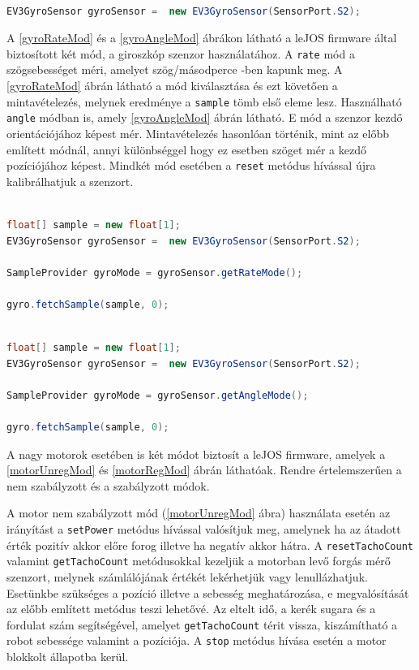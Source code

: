 \begin{lstlisting}[label=gyroPort, caption= Az \texttt{S2} porton keresztük hozzáférés a giroszkop szenzorhoz, language=Java]

EV3GyroSensor gyroSensor =  new EV3GyroSensor(SensorPort.S2);

\end{lstlisting}

A \ref{gyroRateMod} és a \ref{gyroAngleMod} ábrákon látható a leJOS firmware által biztosított két mód, a giroszkóp szenzor használatához. A \texttt{rate} mód a szögsebességet méri, amelyet szög/másodperce -ben kapunk meg. A \ref{gyroRateMod} ábrán látható a mód kiválasztása és ezt követően a mintavételezés, melynek eredménye a \texttt{sample} tömb első eleme lesz. Használható \texttt{angle} módban is, amely \ref{gyroAngleMod} ábrán látható. E mód a szenzor kezdő orientációjához képest mér. Mintavételezés hasonlóan történik, mint az előbb említett módnál, annyi különbséggel hogy ez esetben szöget mér a kezdő pozíciójához képest. Mindkét mód esetében a \texttt{reset} metódus hívással újra kalibrálhatjuk a szenzort.

\begin{lstlisting}[label=gyroRateMod, caption= Giroszkóp szenzor \texttt{rate} mód használata, language=Java]

float[] sample = new float[1];
EV3GyroSensor gyroSensor =  new EV3GyroSensor(SensorPort.S2);

SampleProvider gyroMode = gyroSensor.getRateMode();

gyro.fetchSample(sample, 0);

\end{lstlisting}

\begin{lstlisting}[label=gyroAngleMod, caption= Giroszkóp szenzor \texttt{angle} mód használata, language=Java]

float[] sample = new float[1];
EV3GyroSensor gyroSensor =  new EV3GyroSensor(SensorPort.S2);

SampleProvider gyroMode = gyroSensor.getAngleMode();

gyro.fetchSample(sample, 0);

\end{lstlisting}

A nagy motorok esetében is két módot biztosít a leJOS firmware, amelyek a \ref{motorUnregMod} és \ref{motorRegMod} ábrán láthatóak. Rendre értelemszerűen a nem szabályzott és a szabályzott módok. 

A motor nem szabályzott mód (\ref{motorUnregMod} ábra) használata esetén az irányítást a \texttt{setPower} metódus hívással valósítjuk meg, amelynek ha az átadott érték pozitív akkor előre forog illetve ha negatív akkor hátra. A \texttt{resetTachoCount} valamint \texttt{getTachoCount} metódusokkal kezeljük a motorban levő forgás mérő szenzort, melynek számlálójának értékét lekérhetjük vagy lenullázhatjuk. Esetünkbe szükséges a pozíció illetve a sebesség meghatározása, e megvalósítását az előbb említett metódus teszi lehetővé. Az eltelt idő, a kerék sugara és a fordulat szám segítségével, amelyet \texttt{getTachoCount} térit vissza, kiszámítható a robot sebessége valamint a pozíciója. A \texttt{stop} metódus hívása esetén a motor blokkolt állapotba kerül.    

